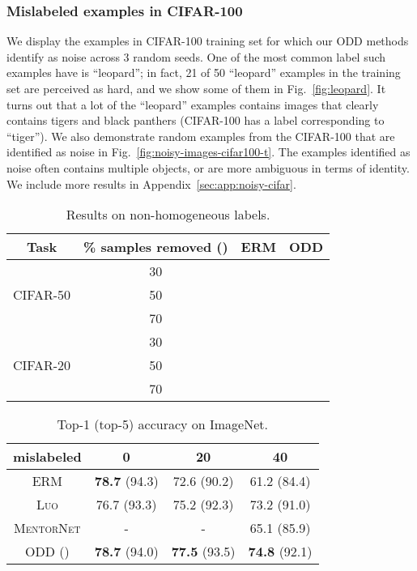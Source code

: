 \documentclass[a4paper,11pt]{article}
\begin{document}
\subsubsection{Mislabeled examples in CIFAR-100} 
We display the examples in CIFAR-100 training set for which our \textsc{ODD} methods identify as noise across 3 random seeds. One of the most common label such examples have is ``leopard''; in fact, 21 of 50 ``leopard'' examples in the training set are perceived as hard, and we show some of them in Fig.~\ref{fig:leopard}. It turns out that a lot of the ``leopard'' examples contains images that clearly contains tigers and black panthers (CIFAR-100 has a label corresponding to ``tiger''). We also demonstrate random examples from the CIFAR-100 that are identified as noise in Fig.~\ref{fig:noisy-images-cifar100-t}. The examples identified as noise often contains multiple objects, or are more ambiguous in terms of identity. We include more results in Appendix~\ref{sec:app:noisy-cifar}.









\setlength{\tabcolsep}{5pt}
\begin{table}
\centering
    \caption{Results on non-homogeneous labels.}
\label{tab:cifar-merge}
\begin{tabular}{c|c|cc}
\toprule
    Task & \% samples removed () & \textsc{ERM} & \textsc{ODD} \\\midrule
  \multirow{3}{*}{CIFAR-50} 
  & 30 &  &  \\
  & 50 &  &  \\
  & 70 &  &   \\\midrule
  \multirow{3}{*}{CIFAR-20}  
  & 30 &  &  \\
  & 50 &  &  \\
  & 70 &  &  \\
  \bottomrule
\end{tabular}
\end{table}



\begin{table}
\begin{center}
\caption{Top-1 (top-5) accuracy on ImageNet.}
\label{tab:imagenet-uniform-noise}
\begin{tabular}{c|ccc}
\toprule
 mislabeled &  0 & 20 & 40 \\\midrule
\textsc{ERM} & \textbf{78.7} (94.3) & 72.6 (90.2) & 61.2 (84.4) \\
\textsc{Luo} & 76.7 (93.3) & 75.2 (92.3) & 73.2 (91.0) \\
\textsc{MentorNet} & -  & -  & 65.1 (85.9) \\\midrule
\textsc{ODD} () & \textbf{78.7} (94.0) & \textbf{77.5} (93.5) & \textbf{74.8} (92.1)
  \\\bottomrule
\end{tabular}
\end{center}
\end{table}
\end{document}
